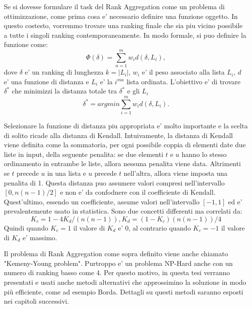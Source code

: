 Se si dovesse formulare il task del Rank Aggregation come un problema di ottimizzazione, come prima cosa e' necessario definire una funzione oggetto. In questo costesto, vorremmo trovare una ranking finale che sia piu vicino possibile a tutte i singoli ranking contemporaneamente. In modo formale, si puo definire la funzione come: \[ \Phi(\delta) = \sum_{n=1}^{m} w_id(\delta,L_i), \]	
dove $\delta$ e' un ranking di lunghezza $k=|L_i|$, $w_i$ e' il peso associato alla lista $L_i$, $d$ e' una funzione di distanza e $L_i$ e' la $i^{ma}$ lista ordinata.
L'obiettivo e' di trovare $\delta^*$ che minimizzi la distanza totale tra $\delta^*$ e gli $L_i$
\[ \delta^* = arg min \sum_{i=1}^{m} w_id(\delta,L_i). \]

Selezionare la funzione di distanza piu appropriata e' molto importante e la scelta di solito ricade alla distanza di Kendall.
Intuivamente, la distanza di Kendall viene definita come la sommatoria, per ogni possibile coppia di elementi date due liste in input, della seguente penalita:
se due elementi $t$ e $u$ hanno lo stesso ordinamento in entrambe le liste, allora nessuna penalita viene data. Altrimenti se $t$ precede $u$ in una lista e $u$ precede $t$ nell'altra, allora viene imposta una penalita di 1.
Questa distanza puo assumere valori compresi nell'intervallo $[0,n(n-1)/2]$ e non e' da confodnere con il coefficiente di Kendall. Quest'ultimo, essendo un coefficiente, assume valori nell'intervallo $[-1,1]$ ed e' prevalentemente usato in statistica. Sono due concetti differenti ma correlati da:
\[K_c=1-4K_d/(n(n-1)), K_d = (1-K_c)(n(n-1))/4\]
Quindi quando $K_c=1$ il valore di $K_d$ e' 0, al contrario quando $K_c=-1$ il valore di $K_d$ e' massimo.

Il problema di Rank Aggregation come sopra definito viene anche chiamato "Kemeny-Young problem". Purtroppo e' un problema NP-Hard anche con un numero di ranking basso come 4. Per questo motivo, in questa tesi verranno presentati e usati anche metodi alternativi che approssimino la soluzione in modo più efficiente, come ad esempio Borda. Dettagli su questi metodi saranno esposti nei capitoli successivi.